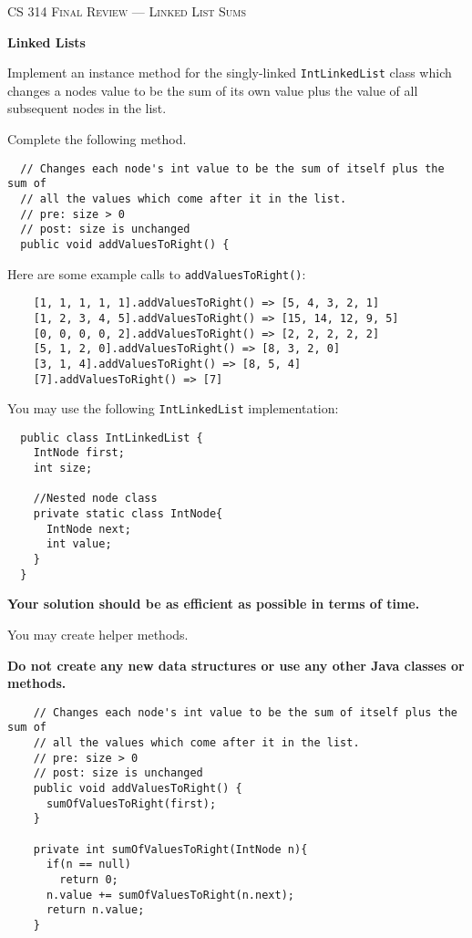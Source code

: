 \documentclass[12pt,letter]{article}
\begin{document}
\noindent\textsc{\large CS 314 Final Review --- Linked List Sums}

\vspace{6pt}
\noindent\textbf{Linked Lists}

\vspace{2pt}
\noindent Implement an instance method for the singly-linked \texttt{IntLinkedList} class which changes a nodes value to be the sum of its own value
plus the value of all subsequent nodes in the list.

\vspace{4pt}
\noindent Complete the following method.
\begin{verbatim}
  // Changes each node's int value to be the sum of itself plus the sum of
  // all the values which come after it in the list.
  // pre: size > 0
  // post: size is unchanged
  public void addValuesToRight() {
\end{verbatim}

\vspace{4pt}
\noindent Here are some example calls to \texttt{addValuesToRight()}:
\begin{verbatim}
    [1, 1, 1, 1, 1].addValuesToRight() => [5, 4, 3, 2, 1]
    [1, 2, 3, 4, 5].addValuesToRight() => [15, 14, 12, 9, 5]
    [0, 0, 0, 0, 2].addValuesToRight() => [2, 2, 2, 2, 2]
    [5, 1, 2, 0].addValuesToRight() => [8, 3, 2, 0]
    [3, 1, 4].addValuesToRight() => [8, 5, 4]
    [7].addValuesToRight() => [7]
\end{verbatim}

\vspace{4pt}
\noindent You may use the following \texttt{IntLinkedList} implementation:

\begin{verbatim}
  public class IntLinkedList {
    IntNode first;
    int size;

    //Nested node class
    private static class IntNode{
      IntNode next;
      int value;
    }
  }
\end{verbatim}

\noindent \textbf{Your solution should be as efficient as possible in terms of time.}

\noindent You may create helper methods.

\noindent \textbf{Do not create any new data structures or use any other Java classes or methods.}

\clearpage
\begin{verbatim}
    // Changes each node's int value to be the sum of itself plus the sum of
    // all the values which come after it in the list.
    // pre: size > 0
    // post: size is unchanged
    public void addValuesToRight() {
      sumOfValuesToRight(first);
    }

    private int sumOfValuesToRight(IntNode n){
      if(n == null)
        return 0;
      n.value += sumOfValuesToRight(n.next);
      return n.value;
    }
\end{verbatim}
\end{document}

